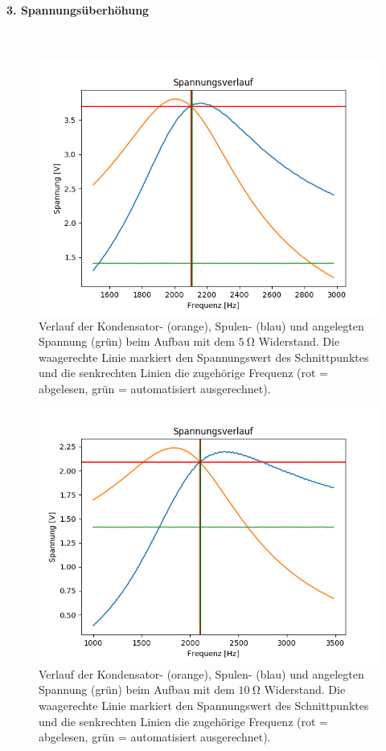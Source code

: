\documentclass[12pt,a4paper]{article}
\begin{document}
\paragraph{3. Spannungsüberhöhung}\mbox{}\\
\begin{figure}
\centering
\includegraphics[scale=0.8]{Bilder/Serie_Spannungsueberhoehung_A_5.png}
\caption{Verlauf der Kondensator- (orange), Spulen- (blau) und angelegten Spannung (grün) beim Aufbau mit dem $\SI{5}{\ohm}$ Widerstand. Die waagerechte Linie markiert den Spannungswert des Schnittpunktes und die senkrechten Linien die zugehörige Frequenz (rot = abgelesen, grün = automatisiert ausgerechnet).}
\label{fig:Serie_Spannungsueberhoehung_A_5}
\end{figure}
\begin{figure}
\centering
\includegraphics[scale=0.8]{Bilder/Serie_Spannungsueberhoehung_A_10.png}
\caption{Verlauf der Kondensator- (orange), Spulen- (blau) und angelegten Spannung (grün) beim Aufbau mit dem $\SI{10}{\ohm}$ Widerstand. Die waagerechte Linie markiert den Spannungswert des Schnittpunktes und die senkrechten Linien die zugehörige Frequenz (rot = abgelesen, grün = automatisiert ausgerechnet).}
\label{fig:Serie_Spannungsueberhoehung_A_10}
\end{figure}
\end{document}
